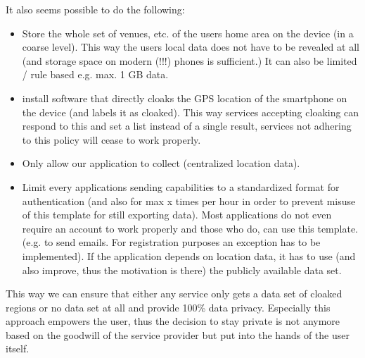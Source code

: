 It also seems possible to do the following: 
\begin{itemize}
	\item Store the whole set of venues, etc. of the users home area on the device (in a coarse level). This way the users local data does not have to be revealed at all (and storage space on modern (!!!) phones is sufficient.) It can also be limited / rule based e.g. max. 1 GB data.
	\item install software that directly cloaks the GPS location of the smartphone on the device (and labels it as cloaked). This way services accepting cloaking can respond to this and set a list instead of a single result, services not adhering to this policy will cease to work properly.
	\item Only allow our application to collect (centralized location data).
	\item Limit every applications sending capabilities to a standardized format for authentication (and also for max x times per hour in order to prevent misuse of this template for still exporting data). Most applications do not even require an account to work properly and those who do, can use this template. (e.g. to send emails. For registration purposes an exception has to be implemented). If the application depends on location data, it has to use (and also improve, thus the motivation is there) the publicly available data set.
\end{itemize}
This way we can ensure that either any service only gets a data set of cloaked regions or no data set at all and provide 100\% data privacy. Especially this approach empowers the user, thus the decision to stay private is not anymore based on the goodwill of the service provider but put into the hands of the user itself.